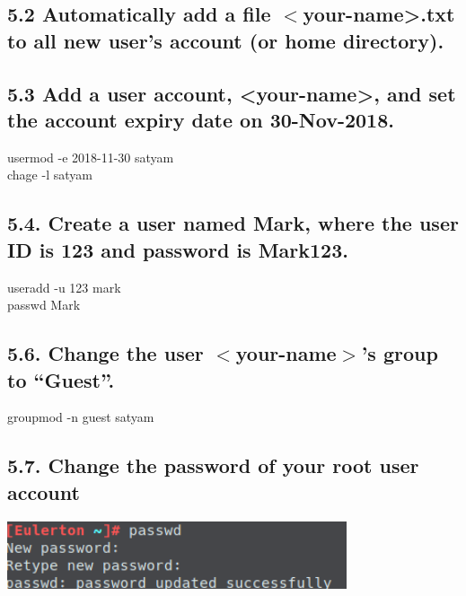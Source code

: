 \documentclass[11pt,a4]{article}
\begin{document}
	\subsection*{5.2 Automatically add a file $<$your-name>.txt to all new user’s account (or home directory).}
		
		\subsection*{5.3 Add a user account, <your-name>, and set the account expiry date on 30-Nov-2018.}
		usermod -e 2018-11-30 satyam\\
	   chage -l satyam
		\subsection*{	5.4. Create a user named Mark, where the user ID is 123 and password is Mark123.}
useradd -u 123 mark\\
 passwd Mark
 \subsection*{5.6. Change the user $<$your-name$>$’s group to “Guest”.}
 groupmod -n guest satyam
\subsection*{5.7. Change the password of your root user account}
  \includegraphics[width=10cm]{Q57.png}
\end{document}
